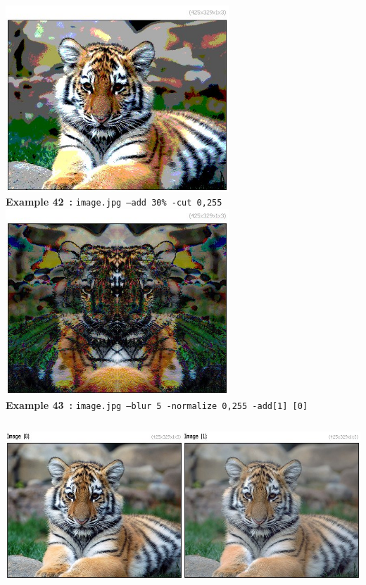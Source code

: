 \documentclass[a4paper,11pt,twoside]{book}
\begin{document}
\begin{center}\includegraphics[keepaspectratio=true,height=7cm,width=\textwidth]{img/gmic_def42.jpg}\\
{\footnotesize \textbf{Example 42~:} \texttt{image.jpg --add 30\% -cut 0,255}}
\\\includegraphics[keepaspectratio=true,height=7cm,width=\textwidth]{img/gmic_def43.jpg}\\
{\footnotesize \textbf{Example 43~:} \texttt{image.jpg --blur 5 -normalize 0,255 -add[1] [0]}}
\\\includegraphics[keepaspectratio=true,height=7cm,width=\textwidth]{img/gmic_def44.jpg}\\

\end{center}
\end{document}

